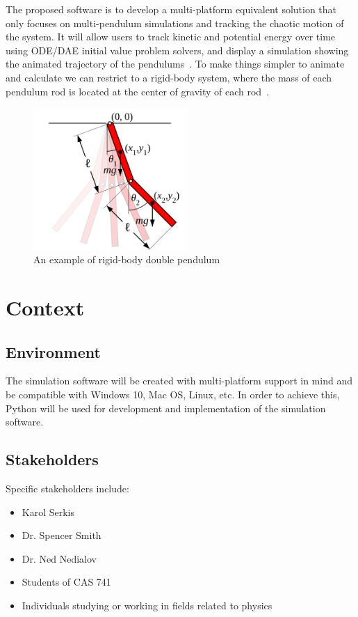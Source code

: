 \documentclass{article}
\begin{document}
The proposed software is to develop a multi-platform equivalent solution that
only focuses on multi-pendulum simulations and tracking the chaotic motion of
the system. It will allow users to track kinetic and potential energy over time 
using ODE/DAE initial value problem solvers, and display a simulation showing
the animated trajectory of the pendulums~\cite{DAETS}. To make things simpler
to animate and calculate we can restrict to a rigid-body system, where the mass 
of each pendulum rod is located at the center of gravity of each 
rod~\cite{DoublePendulum}.

\begin{figure}[!htb]
	\centering
	\includegraphics[width=220px]{Double-pendulum-rigid.png}
	\caption{An example of rigid-body double 
	pendulum~\cite{DoublePendulum}}
	\label{fig:multipend}
\end{figure}

\section*{Context}
\subsection*{Environment}
The simulation software will be created with multi-platform support in mind and
be compatible with Windows 10, Mac OS, Linux, etc. In order to achieve this,
Python will be used for development and implementation of the simulation
software.

\subsection*{Stakeholders}
Specific stakeholders include:
\begin{itemize}
\item Karol Serkis
\item Dr. Spencer Smith
\item Dr. Ned Nedialov
\item Students of CAS 741 
\item Individuals studying or working in fields related to physics
\end{itemize}
\end{document}
